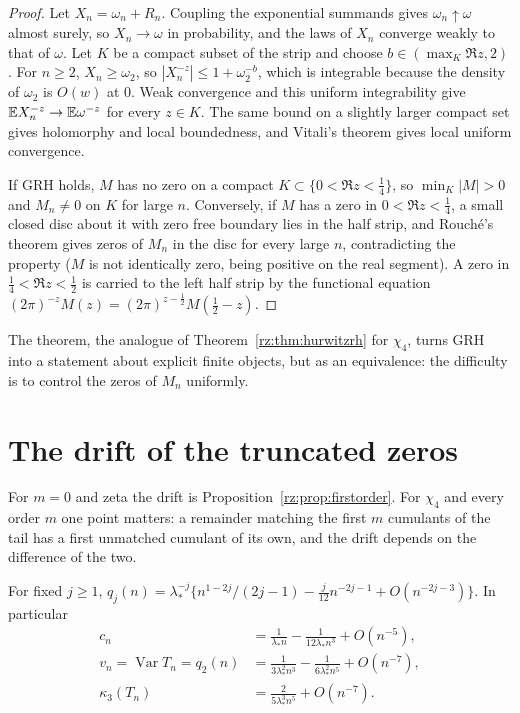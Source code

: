 \begin{proof}
Let $X_n=\omega_n+R_n$. Coupling the exponential summands gives $\omega_n\uparrow\omega$ almost surely, so $X_n\to\omega$ in probability, and the laws of $X_n$ converge weakly to that of $\omega$. Let $K$ be a compact subset of the strip and choose $b\in(\max_K\Re z,2)$. For $n\ge2$, $X_n\ge\omega_2$, so $|X_n^{-z}|\le1+\omega_2^{-b}$, which is integrable because the density of $\omega_2$ is $O(w)$ at $0$. Weak convergence and this uniform integrability give $\mathbb{E} X_n^{-z}\to\mathbb{E}\omega^{-z}$ for every $z\in K$. The same bound on a slightly larger compact set gives holomorphy and local boundedness, and Vitali's theorem gives local uniform convergence.

If GRH holds, $M$ has no zero on a compact $K\subset\{0<\Re z<\frac14\}$, so $\min_K|M|>0$ and $M_n\ne0$ on $K$ for large $n$. Conversely, if $M$ has a zero in $0<\Re z<\frac14$, a small closed disc about it with zero free boundary lies in the half strip, and Rouch\'e's theorem gives zeros of $M_n$ in the disc for every large $n$, contradicting the property ($M$ is not identically zero, being positive on the real segment). A zero in $\frac14<\Re z<\frac12$ is carried to the left half strip by the functional equation $(2\pi)^{-z}M(z)=(2\pi)^{z-\frac12}M(\frac12-z)$.
\end{proof}

The theorem, the analogue of Theorem~\ref{rz:thm:hurwitzrh} for $\chi_4$, turns GRH into a statement about explicit finite objects, but as an equivalence: the difficulty is to control the zeros of $M_n$ uniformly.

\section{The drift of the truncated zeros}\label{tr:sec:drift}

For $m=0$ and zeta the drift is Proposition~\ref{rz:prop:firstorder}. For $\chi_4$ and every order $m$ one point matters: a remainder matching the first $m$ cumulants of the tail has a first unmatched cumulant of its own, and the drift depends on the difference of the two.

\begin{lemma}\label{tr:lem:tail}
For fixed $j\ge1$, $q_j(n)=\lambda_*^{-j}\big\{n^{1-2j}/(2j-1)-\frac j{12}n^{-2j-1}+O(n^{-2j-3})\big\}$. In particular
\begin{align*}
c_n&=\frac1{\lambda_*n}-\frac1{12\lambda_*n^3}+O(n^{-5}),\\
v_n=\operatorname{Var}T_n=q_2(n)&=\frac1{3\lambda_*^2n^3}-\frac1{6\lambda_*^2n^5}+O(n^{-7}),\\
\kappa_3(T_n)&=\frac2{5\lambda_*^3n^5}+O(n^{-7}).
\end{align*}
\end{lemma}

